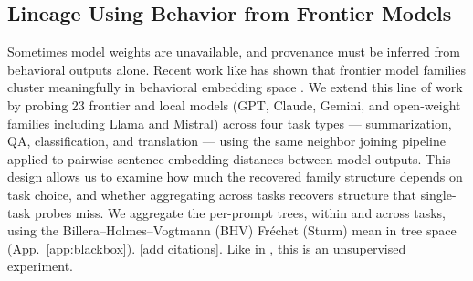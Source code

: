 \documentclass{article}
\theoremstyle{definition}
\theoremstyle{plain}
\begin{document}




\subsection{Lineage Using Behavior from Frontier Models}
\label{sec:exp:blackbox}

Sometimes model weights are unavailable, and provenance must be inferred from behavioral outputs alone. Recent work like \cite{yax2025phylolm} has shown that frontier model families cluster meaningfully in behavioral embedding space
\citep{wu2026llmdna, yax2025phylolm}. We extend this line of work by probing 23 frontier and local models (GPT, Claude, Gemini, and open-weight families including Llama and Mistral) across four task types --- summarization, QA, classification, and translation --- using the same neighbor joining pipeline applied to pairwise sentence-embedding distances between model outputs. This design allows us to examine how much the recovered family structure depends
on task choice, and whether aggregating across tasks recovers structure that
single-task probes miss. We aggregate the per-prompt trees, within and across tasks, using the
Billera--Holmes--Vogtmann (BHV) Fr\'echet (Sturm) mean in tree space (App.~\ref{app:blackbox}). [add citations].  Like in \cite{yax2025phylolm}, this is an unsupervised experiment.
\end{document}
